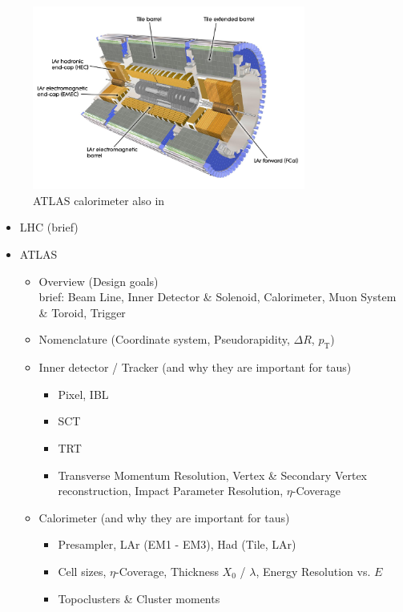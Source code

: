 

\begin{figure}[ht]
  \centering
  \includegraphics[width=0.8\textwidth]{./figures/atlas/calorimeter.jpg}
  \caption{ATLAS calorimeter\cite{calo_fig} also in \cite{atlas_detector}}
  \label{fig:atlas_indet}
\end{figure}



\begin{itemize}
\item LHC (brief)

\item ATLAS
  \begin{itemize}
  \item Overview (Design goals) \\
    brief: Beam Line, Inner Detector \& Solenoid, Calorimeter, Muon System \&
    Toroid, Trigger

  \item Nomenclature (Coordinate system, Pseudorapidity, $\Delta R$,
    $p_\mathrm{T}$)

  \item Inner detector / Tracker (and why they are important for taus)
    \begin{itemize}
    \item Pixel, IBL
    \item SCT
    \item TRT
    \item  Transverse Momentum Resolution, Vertex \& Secondary Vertex
      reconstruction, Impact Parameter Resolution, $\eta$-Coverage
    \end{itemize}

  \item Calorimeter (and why they are important for taus)
    \begin{itemize}
    \item Presampler, LAr (EM1 - EM3), Had (Tile, LAr)
    \item Cell sizes, $\eta$-Coverage, Thickness $X_0$ / $\lambda$,
      Energy Resolution vs. $E$
    \item Topoclusters \& Cluster moments
    \end{itemize}

  \end{itemize}
\end{itemize}

